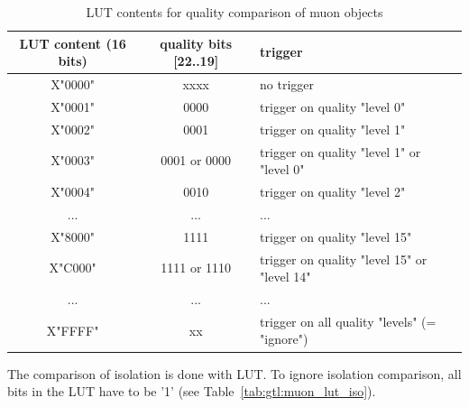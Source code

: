 \begin{table}[htdp]
\begin{center}
\begin{tabular}{|c|c|l|c|}\hline
LUT content (16 bits) & quality bits [22..19] & trigger \\\hline\hline
X"0000" & xxxx & no trigger\\\hline
X"0001" & 0000 & trigger on quality "level 0"\\\hline
X"0002" & 0001 & trigger on quality "level 1"\\\hline
X"0003" & 0001 or 0000 & trigger on quality "level 1" or "level 0"\\\hline
X"0004" & 0010 & trigger on quality "level 2"\\\hline
... & ...& ...\\\hline
X"8000" & 1111 & trigger on quality "level 15"\\\hline
X"C000" & 1111 or 1110 & trigger on quality "level 15" or "level 14"\\\hline
... & ...& ...\\\hline
X"FFFF" & xx & trigger on all quality "levels" (= "ignore")\\\hline
\end{tabular}
\end{center}
\caption{LUT contents for quality comparison of muon objects}
\label{tab:gtl:muon_lut_qual}
\end{table}

The comparison of isolation is done with LUT. To ignore isolation comparison, all bits in the LUT have to be '1' (see Table~\ref{tab:gtl:muon_lut_iso}).\\

